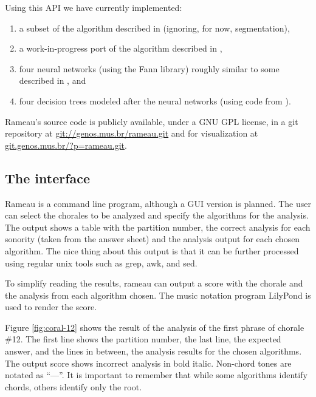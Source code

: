 \documentclass{article}
\begin{document}
Using this API we have currently implemented:

\begin{enumerate}
\item a subset of the algorithm described in \cite{pardo.ea:algorithms}
  (ignoring, for now, segmentation), 
\item a work-in-progress port of the algorithm described in
  \cite{temperley.ea:modeling}, 
\item four neural networks (using the Fann \cite{nissen:fann}
  library) roughly similar to some described in
  \cite{tsui:harmonic}, and
\item four decision trees modeled after the neural networks (using code
  from \cite{mitchell:machine}).
\end{enumerate}

Rameau's source code is publicly available, under a GNU GPL
\cite{fsf:gpl} license, in a git \cite{baudis:git}
repository at \url{git://genos.mus.br/rameau.git} and for
visualization at \url{git.genos.mus.br/?p=rameau.git}.

\subsection{The interface}
\label{sec:analysis-output}

Rameau is a command line program, although a GUI version is planned.
The user can select the chorales to be analyzed and specify the
algorithms for the analysis. The output shows a table with the
partition number, the correct analysis for each sonority (taken from
the answer sheet) and the analysis output for each chosen algorithm.
The nice thing about this output is that it can be further processed
using regular unix tools such as grep, awk, and sed.

To simplify reading the results, rameau can output a score with the
chorale and the analysis from each algorithm chosen. The music
notation program LilyPond \cite{nienhuys.ea:lilypond} is used to
render the score.

Figure \ref{fig:coral-12} shows the result of the analysis of the
first phrase of chorale \#12. The first line shows the partition
number, the last line, the expected answer, and the lines in between,
the analysis results for the chosen algorithms. The output score shows
incorrect analysis in bold italic. Non-chord tones are notated as
``—''. It is important to remember that while some algorithms identify
chords, others identify only the root.
\end{document}
